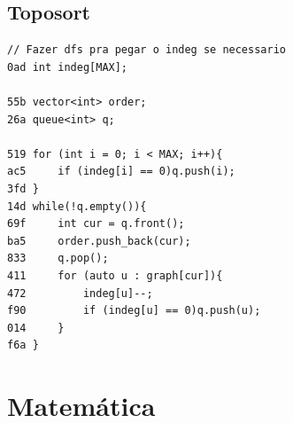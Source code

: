 \documentclass[11pt, a4paper, twoside]{article}
\begin{document}
\subsection{Toposort}
\begin{lstlisting}
// Fazer dfs pra pegar o indeg se necessario
0ad int indeg[MAX];

55b vector<int> order;
26a queue<int> q;

519 for (int i = 0; i < MAX; i++){
ac5     if (indeg[i] == 0)q.push(i);
3fd }
14d while(!q.empty()){
69f     int cur = q.front();   
ba5     order.push_back(cur);
833     q.pop();
411     for (auto u : graph[cur]){
472         indeg[u]--;
f90         if (indeg[u] == 0)q.push(u);
014     }
f6a }
\end{lstlisting}



%
%

\section{Matemática}
\end{document}
